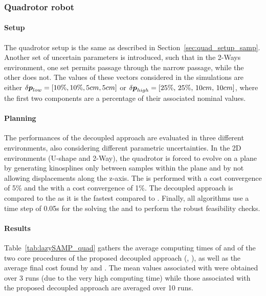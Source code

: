 \subsubsection{Quadrotor robot}

\paragraph{Setup}

The quadrotor setup is the same as described in Section~\ref{sec:quad_setup_samp}.
Another set of uncertain parameters is introduced, such that in the 2-Ways environment, one set permits passage through the narrow passage, while the other does not.
The values of these vectors considered in the simulations are either $\delta\boldsymbol{p}_{low} = [10\% , 10\% ,  5cm , 5cm]$ or $\delta\boldsymbol{p}_{high} = [25\%, \, 25\%, \, 10cm, \, 10cm]$, where the first two components are a percentage of their associated nominal values. 

\paragraph{Planning}

The performances of the decoupled approach are evaluated in three different environments, also considering different parametric uncertainties.
In the 2D environments (U-shape and 2-Way), the quadrotor is forced to evolve on a plane by generating kinosplines only between samples within the plane and by not allowing displacements along the z-axis.
The  is performed with a cost convergence of 5\% and the  with a cost convergence of 1\%.
The decoupled approach is compared to the  as it is the fastest compared to .
Finally, all algorithms use a time step of 0.05s for the solving the  and to perform the robust feasibility checks.

\paragraph{Results}



Table~\ref{tab:lazySAMP_quad} gathers the average computing times of  and of the two core procedures of the proposed decoupled approach (, ), as well as the average final cost found by  and . 
The mean values associated with  were obtained over 3 runs (due to the very high computing time) while those associated with the proposed decoupled approach are averaged over 10 runs.

